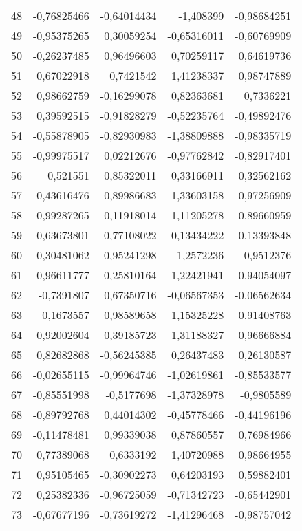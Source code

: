 \begin{longtable}{lrrrr}
 48 & -0,76825466 & -0,64014434 &  -1,408399 & -0,98684251 \\
 49 & -0,95375265 & 0,30059254 & -0,65316011 & -0,60769909 \\
 50 & -0,26237485 & 0,96496603 & 0,70259117 & 0,64619736 \\
 51 & 0,67022918 &  0,7421542 & 1,41238337 & 0,98747889 \\
 52 & 0,98662759 & -0,16299078 & 0,82363681 &  0,7336221 \\
 53 & 0,39592515 & -0,91828279 & -0,52235764 & -0,49892476 \\
 54 & -0,55878905 & -0,82930983 & -1,38809888 & -0,98335719 \\
 55 & -0,99975517 & 0,02212676 & -0,97762842 & -0,82917401 \\
 56 &  -0,521551 & 0,85322011 & 0,33166911 & 0,32562162 \\
 57 & 0,43616476 & 0,89986683 & 1,33603158 & 0,97256909 \\
 58 & 0,99287265 & 0,11918014 & 1,11205278 & 0,89660959 \\
 59 & 0,63673801 & -0,77108022 & -0,13434222 & -0,13393848 \\
 60 & -0,30481062 & -0,95241298 & -1,2572236 & -0,9512376 \\
 61 & -0,96611777 & -0,25810164 & -1,22421941 & -0,94054097 \\
 62 & -0,7391807 & 0,67350716 & -0,06567353 & -0,06562634 \\
 63 &  0,1673557 & 0,98589658 & 1,15325228 & 0,91408763 \\
 64 & 0,92002604 & 0,39185723 & 1,31188327 & 0,96666884 \\
 65 & 0,82682868 & -0,56245385 & 0,26437483 & 0,26130587 \\
 66 & -0,02655115 & -0,99964746 & -1,02619861 & -0,85533577 \\
 67 & -0,85551998 & -0,5177698 & -1,37328978 & -0,9805589 \\
 68 & -0,89792768 & 0,44014302 & -0,45778466 & -0,44196196 \\
 69 & -0,11478481 & 0,99339038 & 0,87860557 & 0,76984966 \\
 70 & 0,77389068 &  0,6333192 & 1,40720988 & 0,98664955 \\
 71 & 0,95105465 & -0,30902273 & 0,64203193 & 0,59882401 \\
 72 & 0,25382336 & -0,96725059 & -0,71342723 & -0,65442901 \\
 73 & -0,67677196 & -0,73619272 & -1,41296468 & -0,98757042 \\

\end{longtable}
